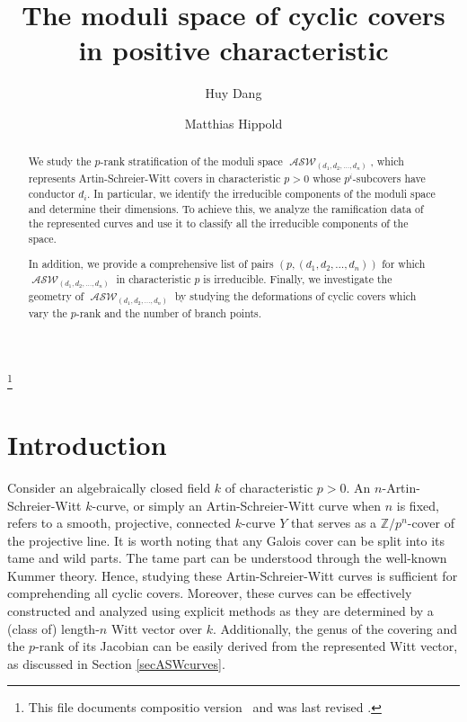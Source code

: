 \documentclass{compositio}
\newcommand*{\pkg}[1]{{\mdseries\textsf{#1}}}
\theoremstyle{remark}
\theoremstyle{remark}
\DeclareMathOperator{\ASW}{\mathcal{ASW}}
\begin{document}
\title{The moduli space of cyclic covers in positive characteristic}

\author{Huy Dang}
\address{National Center for Theoretical Sciences, Mathematics Division, No. 1, Sec. 4, Roosevelt Rd., Taipei City 106, Taiwan Room 503, Cosmology Building, National Taiwan University}

\author{Matthias Hippold}
\address{Einstein Institute of Mathematics, The Hebrew University of Jerusalem, Edmond J.
Safra Campus, Giv’at Ram, Jerusalem, 91904, Israel }


\thanks{This file documents \pkg{compositio} version \Fileversion\ and
was last revised \Filedate.}


\begin{abstract}
We study the $p$-rank stratification of the moduli space $\ASW_{(d_1,d_2,\ldots,d_n)}$, which represents Artin-Schreier-Witt covers in characteristic $p>0$ whose $p^i$-subcovers have conductor $d_i$. In particular, we identify the irreducible components of the moduli space and determine their dimensions. To achieve this, we analyze the ramification data of the represented curves and use it to classify all the irreducible components of the space.

In addition, we provide a comprehensive list of pairs $(p,(d_1,d_2,\ldots,d_n))$ for which $\ASW_{(d_1,d_2,\ldots,d_n)}$ in characteristic $p$ is irreducible. Finally, we investigate the geometry of $\ASW_{(d_1,d_2,\ldots,d_n)}$ by studying the deformations of cyclic covers which vary the $p$-rank and the number of branch points.
\end{abstract}
 
\maketitle

\vspace*{6pt}\tableofcontents

\section{Introduction}

Consider an algebraically closed field $k$ of characteristic $p > 0$. An $n$-Artin-Schreier-Witt $k$-curve, or simply an Artin-Schreier-Witt curve when $n$ is fixed, refers to a smooth, projective, connected $k$-curve $Y$ that serves as a $\mathbb{Z}/p^n$-cover of the projective line. It is worth noting that any Galois cover can be split into its tame and wild parts. The tame part can be understood through the well-known Kummer theory. Hence, studying these Artin-Schreier-Witt curves is sufficient for comprehending all cyclic covers. Moreover, these curves can be effectively constructed and analyzed using explicit methods as they are determined by a (class of) length-$n$ Witt vector over $k$. Additionally, the genus of the covering and the $p$-rank of its Jacobian can be easily derived from the represented Witt vector, as discussed in Section \ref{secASWcurves}.
\end{document}
